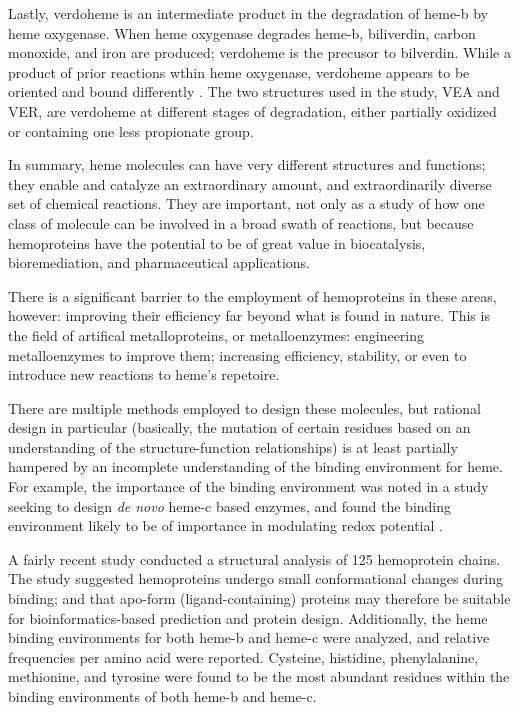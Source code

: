 \documentclass[a4paper, nobind]{templates/ociamthesis}
\begin{document}
Lastly, verdoheme is an intermediate product in the degradation of heme-b by heme oxygenase. When heme oxygenase degrades heme-b, biliverdin, carbon monoxide, and iron are produced; verdoheme is the precusor to bilverdin\autocite{Lai2010,Sato2007}. While a product of prior reactions wthin heme oxygenase, verdoheme appears to be oriented and bound differently \autocite{Lad2004}. The two structures used in the study, VEA and VER, are verdoheme at different stages of degradation, either partially oxidized or containing one less propionate group.

In summary, heme molecules can have very different structures and functions; they enable and catalyze an extraordinary amount, and extraordinarily diverse set of chemical reactions. They are important, not only as a study of how one class of molecule can be involved in a broad swath of reactions, but because hemoproteins have the potential to be of great value in biocatalysis, bioremediation, and pharmaceutical applications.

There is a significant barrier to the employment of hemoproteins in these areas, however: improving their efficiency far beyond what is found in nature. This is the field of artifical metalloproteins, or metalloenzymes: engineering metalloenzymes to improve them; increasing efficiency, stability, or even to introduce new reactions to heme's repetoire.

There are multiple methods employed to design these molecules, but rational design in particular (basically, the mutation of certain residues based on an understanding of the structure-function relationships) is at least partially hampered by an incomplete understanding of the binding environment for heme. For example, the importance of the binding environment was noted in a study seeking to design \emph{de novo} heme-c based enzymes, and found the binding environment likely to be of importance in modulating redox potential \autocite{Ishida2004}.

A fairly recent study conducted a structural analysis of 125 hemoprotein chains\autocite{Li2011}. The study suggested hemoproteins undergo small conformational changes during binding; and that apo-form (ligand-containing) proteins may therefore be suitable for bioinformatics-based prediction and protein design. Additionally, the heme binding environments for both heme-b and heme-c were analyzed, and relative frequencies per amino acid were reported. Cysteine, histidine, phenylalanine, methionine, and tyrosine were found to be the most abundant residues within the binding environments of both heme-b and heme-c.~
\end{document}
